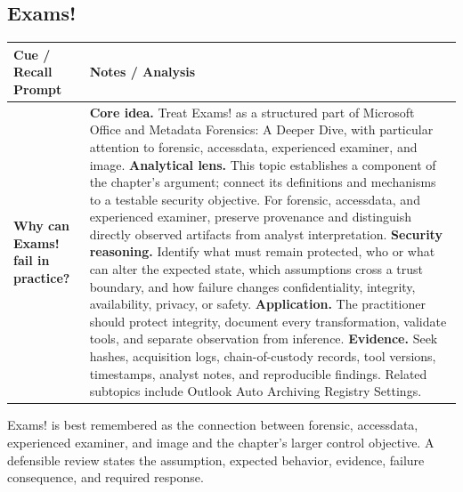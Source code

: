 \documentclass[11pt]{article}
\newcommand{\CornellHeader}{%
\rowcolor{Navy}\color{white}\bfseries Cue / Recall Prompt & \color{white}\bfseries Notes / Analysis\\\hline}
\newcommand{\CornellRow}[2]{%
\cellcolor{CueGray}\RaggedRight\textbf{#1} & \RaggedRight #2\\\hline}
\begin{document}
\subsection*{Exams!}
\begin{longtable}{>{\RaggedRight\arraybackslash}p{}|>{\RaggedRight\arraybackslash}p{}}
\CornellHeader
\CornellRow{Why can Exams! fail in practice?}{\textbf{Core idea.} Treat Exams! as a structured part of Microsoft Office and Metadata Forensics: A Deeper Dive, with particular attention to forensic, accessdata, experienced examiner, and image. \textbf{Analytical lens.} This topic establishes a component of the chapter's argument; connect its definitions and mechanisms to a testable security objective. For forensic, accessdata, and experienced examiner, preserve provenance and distinguish directly observed artifacts from analyst interpretation. \textbf{Security reasoning.} Identify what must remain protected, who or what can alter the expected state, which assumptions cross a trust boundary, and how failure changes confidentiality, integrity, availability, privacy, or safety. \textbf{Application.} The practitioner should protect integrity, document every transformation, validate tools, and separate observation from inference. \textbf{Evidence.} Seek hashes, acquisition logs, chain-of-custody records, tool versions, timestamps, analyst notes, and reproducible findings. Related subtopics include Outlook Auto Archiving Registry Settings.}
\end{longtable}
\begin{topicsummary}
Exams! is best remembered as the connection between forensic, accessdata, experienced examiner, and image and the chapter's larger control objective. A defensible review states the assumption, expected behavior, evidence, failure consequence, and required response.
\end{topicsummary}
\end{document}

